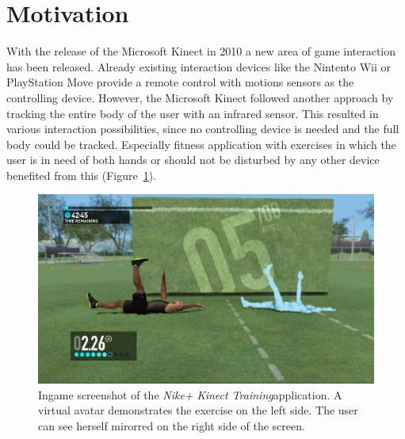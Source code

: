 \section{Motivation}
With the release of the Microsoft Kinect in 2010 a new area of game interaction has been released.
Already existing interaction devices like the Nintento Wii or PlayStation Move provide a remote control with motions sensors as the controlling device.
However, the Microsoft Kinect followed another approach by tracking the entire body of the user with an infrared sensor.
This resulted in various interaction possibilities, since no controlling device is needed and the full body could be tracked.
Especially fitness application with exercises in which the user is in need of both hands or should not be disturbed by any other device benefited from this (Figure~\ref{fig:1_kinectSports}).
\begin{figure}[htb]
	\centering
	\begin{minipage}[t]{1\linewidth}
		\centering
		\includegraphics[width=0.55\linewidth]{Pictures/1_nikePlusKinect2}
		\caption{Ingame screenshot of the \textit{Nike+ Kinect Training}\protect\footnotemark application. A virtual avatar demonstrates the exercise on the left side. The user can see herself mirorred on the right side of the screen.}
		\label{fig:1_kinectSports}
	\end{minipage}
\end{figure}


